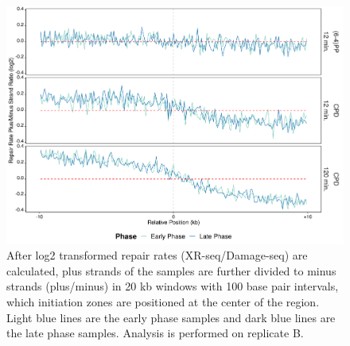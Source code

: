 \begin{figure}[H]
\begin{center}
\includegraphics[width=\textwidth]{Chapters/7_appendix/figures/supfig43}
\caption[Repair rate plus/minus ratio of initiation zones in 20 kb (replicate B).]{After log2 transformed repair rates (XR-seq/Damage-seq) are calculated, plus strands of the samples are further divided to minus strands (plus/minus) in 20 kb windows with 100 base pair intervals, which initiation zones are positioned at the center of the region. Light blue lines are the early phase samples and dark blue lines are the late phase samples. Analysis is performed on replicate B.}
\label{supfig:rrpm20inzonesB}
\end{center}
\end{figure}


